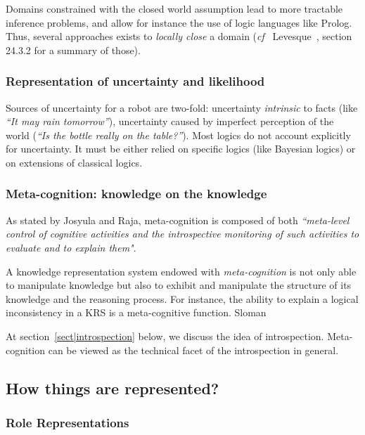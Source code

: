 \documentclass[a4paper, twocolumn]{article}
\newcommand{\cf}{{\textit{cf~}}}
\begin{document}
Domains constrained with the closed world assumption lead to more tractable
inference problems, and allow for instance the use of logic languages like
Prolog. Thus, several approaches exists to \emph{locally close} a domain (\cf
Levesque~\cite{Levesque2008}, section 24.3.2 for a summary of those).


\subsubsection{Representation of uncertainty and likelihood}

Sources of uncertainty for a robot are two-fold: uncertainty \emph{intrinsic}
to facts (like \emph{``It may rain tomorrow''}), uncertainty caused by
imperfect perception of the world (\emph{``Is the bottle really on the
table?''}). Most logics do not account explicitly for uncertainty. It must be
either relied on specific logics (like Bayesian logics) or on extensions of
classical logics.

\subsubsection{Meta-cognition: knowledge on the knowledge}

As stated by Josyula and Raja, meta-cognition is composed of both
\emph{``meta-level control of cognitive activities and the introspective
monitoring of such activities to evaluate and to explain them"}.

A knowledge representation system endowed with \emph{meta-cognition} is not
only able to manipulate knowledge but also to exhibit and manipulate the
structure of its knowledge and the reasoning process. For instance, the ability
to explain a logical inconsistency in a KRS is a meta-cognitive function.
Sloman~\cite{Sloman2011}

At section~\ref{sect|introspection} below, we discuss the idea of
introspection.  Meta-cognition can be viewed as the technical facet of the
introspection in general.


\subsection{How things are represented?}
\label{sect|higher-level-domain-representation}

\subsubsection{Role Representations}
\end{document}
